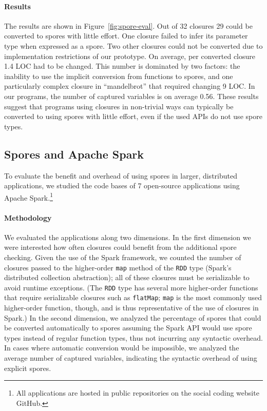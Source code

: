 \documentclass[runningheads]{llncs}
\begin{document}
\begin{sloppypar}
\paragraph{\textbf{Results}} The results are shown in Figure~\ref{fig:spore-eval}. Out of 32 closures 29 could be converted to spores with little effort. One closure failed to infer its parameter type when expressed as a spore. Two other closures could not be converted due to implementation restrictions of our prototype. On average, per converted closure 1.4 LOC had to be changed. This number is dominated by two factors: the inability to use the implicit conversion from functions to spores, and one particularly complex closure in ``mandelbrot'' that required changing 9 LOC. In our programs, the number of captured variables is on average 0.56. These results suggest that programs using closures in non-trivial ways can typically be converted to using spores with little effort, even if the used APIs do not use spore types.

\subsection{Spores and Apache Spark}

To evaluate the benefit and overhead of using spores in larger, distributed
applications, we studied the code bases of 7 open-source applications using
Apache Spark.\footnote{All
applications are hosted in public repositories on the social coding website GitHub.}

\paragraph{\textbf{Methodology}} We evaluated the applications along two
dimensions. In the first dimension we were interested how often closures could
benefit from the additional spore checking. Given the use of the Spark
framework, we counted the number of closures passed to the higher-order
\verb|map| method of the \verb|RDD| type (Spark's distributed collection
abstraction); all of these closures must be serializable to avoid runtime
exceptions. (The \verb|RDD| type has several more higher-order functions that
require serializable closures such as \verb|flatMap|; \verb|map| is the most
commonly used higher-order function, though, and is thus representative of the
use of closures in Spark.) In the second dimension, we analyzed the percentage
of spores that could be converted automatically to spores assuming the Spark
API would use spore types instead of regular function types, thus not
incurring any syntactic overhead. In cases where automatic conversion would be
impossible, we analyzed the average number of captured variables, indicating
the syntactic overhead of using explicit spores.


\end{sloppypar}
\end{document}
